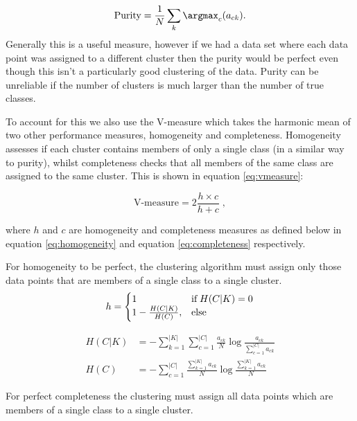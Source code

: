 \begin{equation}
  \label{eq:purity}
  \text{Purity} = \frac{1}{N} \sum_k \argmax_c (a_{ck}).
\end{equation}
Generally this is a useful measure, however if we had a data set where each data point was assigned to a different cluster then the purity would be perfect even though this isn't a particularly good clustering of the data. Purity can be unreliable if the number of clusters is much larger than the number of true classes. 

To account for this we also use the V-measure \citep{Rosenberg2007} which  takes the harmonic mean of two other performance measures, homogeneity and completeness. Homogeneity assesses if each cluster contains members of only a single class (in a similar way to purity), whilst completeness checks that all members of the same class are assigned to the same cluster. This is shown in equation \eqref{eq:vmeasure}:

\begin{equation}
  \label{eq:vmeasure}
  \text{V-measure} = 2 \frac{h \times c}{h + c} \;,
\end{equation}

where $h$ and $c$ are homogeneity and completeness measures as defined below in equation  \eqref{eq:homogeneity} and equation \eqref{eq:completeness} respectively. 

For homogeneity to be perfect, the clustering algorithm must assign only those data points that are members of a single class to a single cluster.
\begin{equation}
\label{eq:homogeneity}
  h=\left\{
  \begin{array}{@{}ll@{}}
    1  & \text{if} \;  H(C|K) = 0 \\
    1 - \frac{H(C|K)}{H(C)}, & \text{else}
  \end{array}\right.
\end{equation} 

\begin{align}
  \label{eq:H(C|K)}
H(C|K) &=  - \sum_{k=1}^{|K|} \sum_{c=1}^{|C|}\frac{a_{ck}}{N} \log \frac{a_{ck}}{\sum_{c=1}^{|C|}a_{ck}}\\
H(C) &=  - \sum_{c=1}^{|C|} \frac{\sum_{k=1}^{|K|}a_{ck}}{N} \log \frac{\sum_{k=1}^{|K|}a_{ck}}{N}
\end{align}

For perfect completeness the clustering must assign all data points which are members of a single class to a single cluster.

